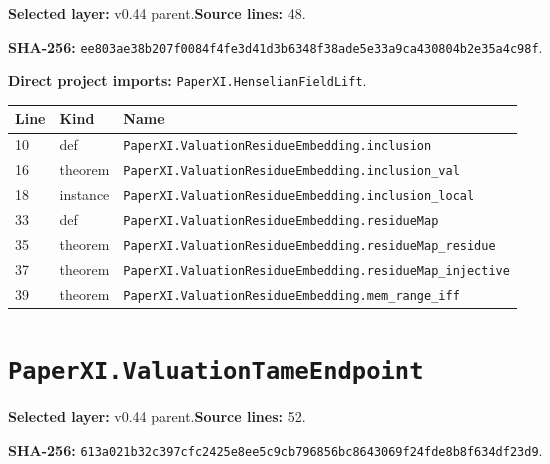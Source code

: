 \documentclass[10pt,oneside]{book}
\begin{document}
\textbf{Selected layer:} v0.44 parent.\quad\textbf{Source lines:} 48.\par\textbf{SHA-256:} {\scriptsize\nolinkurl{ee803ae38b207f0084f4fe3d41d3b6348f38ade5e33a9ca430804b2e35a4c98f}}.


\textbf{Direct project imports:} \nolinkurl{PaperXI.HenselianFieldLift}.

\begin{longtable}{@{}p{}p{}p{}@{}}\toprule Line&Kind&Name\\\midrule\endhead

10&def&\nolinkurl{PaperXI.ValuationResidueEmbedding.inclusion}\\

16&theorem&\nolinkurl{PaperXI.ValuationResidueEmbedding.inclusion_val}\\

18&instance&\nolinkurl{PaperXI.ValuationResidueEmbedding.inclusion_local}\\

33&def&\nolinkurl{PaperXI.ValuationResidueEmbedding.residueMap}\\

35&theorem&\nolinkurl{PaperXI.ValuationResidueEmbedding.residueMap_residue}\\

37&theorem&\nolinkurl{PaperXI.ValuationResidueEmbedding.residueMap_injective}\\

39&theorem&\nolinkurl{PaperXI.ValuationResidueEmbedding.mem_range_iff}\\

\bottomrule\end{longtable}

\section{\texorpdfstring{\nolinkurl{PaperXI.ValuationTameEndpoint}}{PaperXI.ValuationTameEndpoint}}\label{module:PaperXI.ValuationTameEndpoint}

\textbf{Selected layer:} v0.44 parent.\quad\textbf{Source lines:} 52.\par\textbf{SHA-256:} {\scriptsize\nolinkurl{613a021b32c397cfc2425e8ee5c9cb796856bc8643069f24fde8b8f634df23d9}}.

\end{document}
